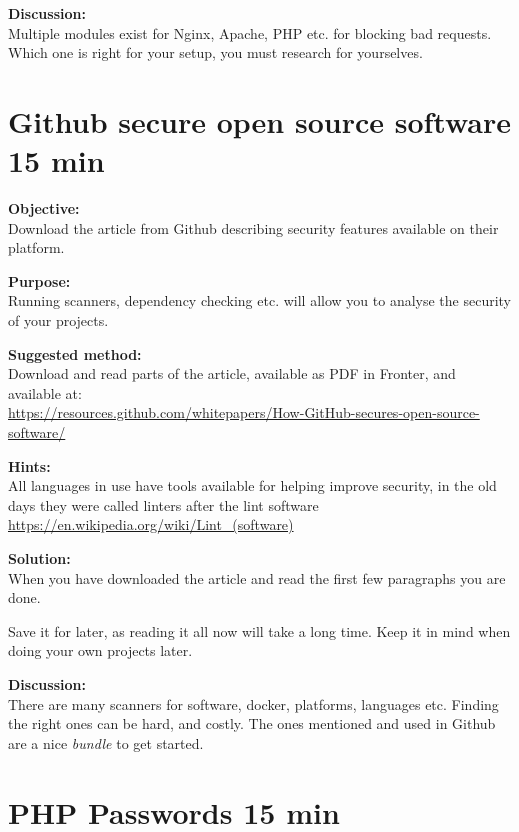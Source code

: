 \documentclass[a4paper,11pt,notitlepage]{report}
\begin{document}
{\bf Discussion:}\\
Multiple modules exist for Nginx, Apache, PHP etc. for blocking bad requests.
Which one is right for your setup, you must research for yourselves.



\chapter{Github secure open source software 15 min}
\label{ex:github-scanning}


{\bf Objective:}\\
Download the article from Github describing security features available on their platform.


{\bf Purpose:}\\
Running scanners, dependency checking etc. will allow you to analyse the security of your projects.



{\bf Suggested method:}\\
Download and read parts of the article, available as PDF in Fronter, and available at:\\
\url{https://resources.github.com/whitepapers/How-GitHub-secures-open-source-software/}

{\bf Hints:}\\
All languages in use have tools available for helping improve security, in the old days they were called linters after the lint software\\
\url{https://en.wikipedia.org/wiki/Lint_(software)}

{\bf Solution:}\\
When you have downloaded the article and read the first few paragraphs you are done.

Save it for later, as reading it all now will take a long time. Keep it in mind when doing your own projects later.

{\bf Discussion:}\\
There are many scanners for software, docker, platforms, languages etc. Finding the right ones can be hard, and costly. The ones mentioned and used in Github are a nice \emph{bundle} to get started.




\chapter{PHP Passwords 15 min}
\label{ex:php-passwords}
\end{document}
